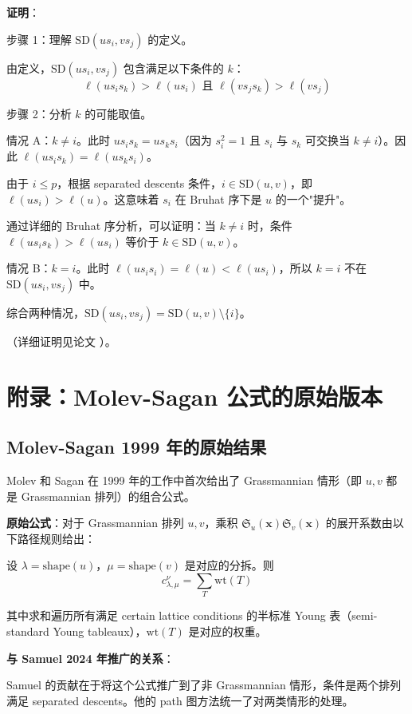 \textbf{证明}：

步骤 1：理解 $\mathrm{SD}(us_i, vs_j)$ 的定义。

由定义，$\mathrm{SD}(us_i, vs_j)$ 包含满足以下条件的 $k$：
$$\ell(us_is_k) > \ell(us_i) \text{ 且 } \ell(vs_js_k) > \ell(vs_j)$$

步骤 2：分析 $k$ 的可能取值。

情况 A：$k \neq i$。此时 $us_is_k = u s_k s_i$（因为 $s_i^2 = 1$ 且 $s_i$ 与 $s_k$ 可交换当 $k \neq i$）。因此 $\ell(us_is_k) = \ell(u s_k s_i)$。

由于 $i \leq p$，根据 separated descents 条件，$i \in \mathrm{SD}(u,v)$，即 $\ell(us_i) > \ell(u)$。这意味着 $s_i$ 在 Bruhat 序下是 $u$ 的一个"提升"。

通过详细的 Bruhat 序分析，可以证明：当 $k \neq i$ 时，条件 $\ell(us_is_k) > \ell(us_i)$ 等价于 $k \in \mathrm{SD}(u,v)$。

情况 B：$k = i$。此时 $\ell(us_is_i) = \ell(u) < \ell(us_i)$，所以 $k = i$ 不在 $\mathrm{SD}(us_i, vs_j)$ 中。

综合两种情况，$\mathrm{SD}(us_i, vs_j) = \mathrm{SD}(u,v) \setminus \{i\}$。

（详细证明见论文 \cite[ Lemma 2.5]{Sa}）。

\section{附录：Molev-Sagan 公式的原始版本}
\label{sec:appendix-ch2-original-MS}

\subsection*{Molev-Sagan 1999 年的原始结果}

Molev 和 Sagan 在 1999 年的工作中首次给出了 Grassmannian 情形（即 $u, v$ 都是 Grassmannian 排列）的组合公式。

\textbf{原始公式}：对于 Grassmannian 排列 $u, v$，乘积 $\mathfrak{S}_u(\mathbf{x}) \mathfrak{S}_v(\mathbf{x})$ 的展开系数由以下路径规则给出：

设 $\lambda = \mathrm{shape}(u)$，$\mu = \mathrm{shape}(v)$ 是对应的分拆。则
$$c_{\lambda, \mu}^{\nu} = \sum_{T} \mathrm{wt}(T)$$

其中求和遍历所有满足 certain lattice conditions 的半标准 Young 表（semi-standard Young tableaux），$\mathrm{wt}(T)$ 是对应的权重。

\textbf{与 Samuel 2024 年推广的关系}：

Samuel 的贡献在于将这个公式推广到了非 Grassmannian 情形，条件是两个排列满足 separated descents。他的 path 图方法统一了对两类情形的处理。

